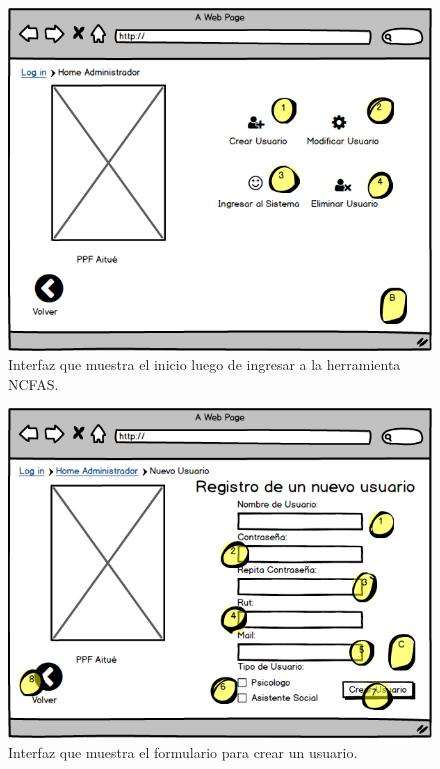 \begin{figure}[h!]
	\label{inicioadm2}
	\begin{center}
		\includegraphics[scale=0.3]{imagenes/inicioadm2.png}
	\end{center}
	\caption{Interfaz que muestra el inicio luego de ingresar a la herramienta NCFAS.}
\end{figure}

\begin{figure}[h!]
	\label{formuser}
	\begin{center}
		\includegraphics[scale=0.3]{imagenes/formuser.png}
	\end{center}
	\caption{Interfaz que muestra el formulario para crear un usuario.}
\end{figure}

